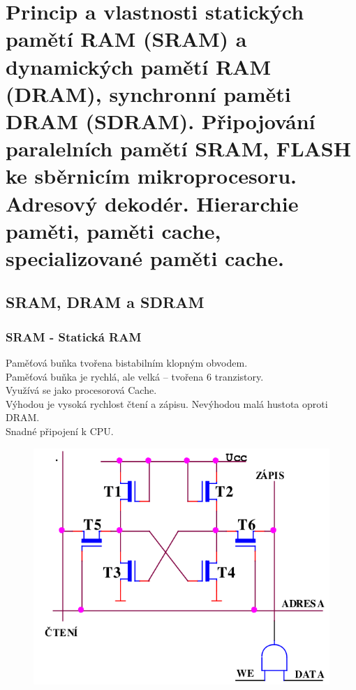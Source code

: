 \section{Princip a vlastnosti statických pamětí RAM (SRAM) a dynamických pamětí RAM (DRAM), synchronní paměti DRAM (SDRAM).
  Připojování paralelních pamětí SRAM, FLASH ke sběrnicím mikroprocesoru. Adresový dekodér.
  Hierarchie paměti, paměti cache, specializované paměti cache.}

\subsection{SRAM, DRAM a SDRAM}
\subsubsection*{SRAM - Statická RAM}
Paměťová buňka tvořena bistabilním klopným obvodem.\\
Paměťová buňka je rychlá, ale velká – tvořena 6 tranzistory.\\
Využívá se jako procesorová Cache.\\
Výhodou je vysoká rychlost čtení a zápisu. Nevýhodou malá hustota oproti DRAM.\\
Snadné připojení k CPU.\\
\begin{figure}[h!]
    \centering
    \includegraphics[scale = 0.3]{img/SRAM.png}
\end{figure}


